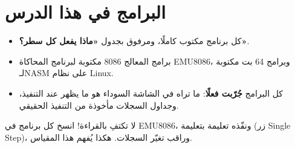 \documentclass[11pt, a4paper, oneside]{report}
\begin{document}
\section*{البرامج في هذا الدرس}
\begin{itemize}
    \item كل برنامج مكتوب كاملًا، ومرفوق بجدول \textbf{«ماذا يفعل كل سطر؟»}.
    \item برامج المعالج \textenglish{8086} مكتوبة لبرنامج المحاكاة \textenglish{EMU8086}،
          وبرامج \textenglish{64} بت مكتوبة لـ\textenglish{NASM} على نظام \textenglish{Linux}.
    \item كل البرامج \textbf{جُرّبت فعلًا}: ما تراه في الشاشة السوداء \faDesktop{} هو ما يظهر عند التنفيذ،
          وجداول السجلات مأخوذة من التنفيذ الحقيقي.
\end{itemize}

\begin{intabih}
    لا تكتفِ بالقراءة! انسخ كل برنامج في \textenglish{EMU8086}، ونفّذه تعليمة بتعليمة
    (زر \textenglish{Single Step})، وراقب تغيّر السجلات. هكذا يُفهم هذا المقياس.
\end{intabih}

\tableofcontents







\end{document}
